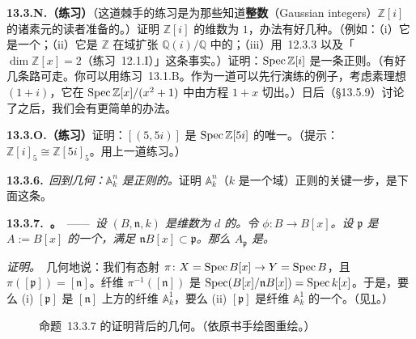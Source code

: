 \textbf{13.3.N.（练习）}\quad （这道棘手的练习是为那些知道\textbf{\trGauss{}整数}（Gaussian integers）$\mathbb{Z}[i]$ 的诸素元的读者准备的。）证明 $\mathbb{Z}[i]$ 的维数为 $1$，办法有好几种。（例如：（i）它是一个\trPID；（ii）它是 $\mathbb{Z}$ 在域扩张 $\mathbb{Q}(i)/\mathbb{Q}$ 中的\trNormalization；（iii）用\trKrull{}\trPrincipalIdealTheorem~12.3.3 以及「$\dim\mathbb{Z}[x]=2$（\mbox{练习~12.1.I}）」这条事实。）证明：$\operatorname{Spec}\mathbb{Z}[i]$ 是一条正则\trCurve。（有好几条路可走。你可以用\mbox{练习~13.1.B}。作为一道可以先行演练的例子，考虑素理想 $(1+i)$，它在 $\operatorname{Spec}\mathbb{Z}[x]/(x^2+1)$ 中由方程 $1+x$ 切出。）日后（\S13.5.9）讨论了\trDVR{}之后，我们会有更简单的办法。

\textbf{13.3.O.（练习）}\quad 证明：$[(5,5i)]$ 是 $\operatorname{Spec}\mathbb{Z}[5i]$ 的唯一\trSingularPoint。（提示：$\mathbb{Z}[i]_5\cong\mathbb{Z}[5i]_5$。用上一道练习。）

\textbf{13.3.6.}\ \emph{回到几何：$\mathbb{A}^n_k$ 是正则的。}\quad 证明 $\mathbb{A}^n_k$（$k$ 是一个域）正则的关键一步，是下面这条。

\textbf{13.3.7.\ \trhProposition{}。}\ ——\ \emph{设 $(B,\mathfrak{n},k)$ 是维数为 $d$ 的\trRegular\trLocalRing。令 $\phi\colon B\to B[x]$。设 $\mathfrak{p}$ 是 $A:=B[x]$ 的一个\trPrimeIdeal，满足 $\mathfrak{n}B[x]\subset\mathfrak{p}$。那么 $A_{\mathfrak{p}}$ 是\trRegular\trLocalRing。}

\emph{证明。}\ 几何地说：我们有态射 $\pi\colon X=\operatorname{Spec} B[x]\to Y=\operatorname{Spec} B$，且 $\pi([\mathfrak{p}])=[\mathfrak{n}]$。纤维 $\pi^{-1}([\mathfrak{n}])$ 是 $\operatorname{Spec}(B[x]/\mathfrak{n}B[x])=\operatorname{Spec} k[x]$。于是，要么 (i) $[\mathfrak{p}]$ 是 $[\mathfrak{n}]$ 上方的纤维 $\mathbb{A}^1_k$，要么 (ii) $[\mathfrak{p}]$ 是纤维 $\mathbb{A}^1_k$ 的一个\trClosedPoint。（见\cref{fig:spec-bx-fiber}。）

\begin{figure}[htbp]
\centering
{}
\caption{命题~13.3.7 的证明背后的几何。（依原书手绘图重绘。）}\label{fig:spec-bx-fiber}
\end{figure}

